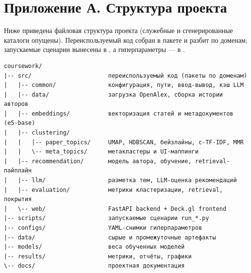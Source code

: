 \appendix
\section*{Приложение А. Структура проекта}

Ниже приведена файловая структура проекта (служебные и сгенерированные каталоги опущены).
Переиспользуемый код собран в пакете  и разбит по доменам; запускаемые сценарии вынесены
в , а гиперпараметры — в .

{\footnotesize
\begin{verbatim}
coursework/
|-- src/                      переиспользуемый код (пакеты по доменам)
|   |-- common/               конфигурация, пути, ввод-вывод, кэш LLM
|   |-- data/                 загрузка OpenAlex, сборка истории авторов
|   |-- embeddings/           векторизация статей и метадокументов (e5-base)
|   |-- clustering/
|   |   |-- paper_topics/     UMAP, HDBSCAN, бейзлайны, c-TF-IDF, MMR
|   |   \-- meta_topics/      метакластеры и UI-маппинги
|   |-- recommendation/       модель автора, обучение, retrieval-пайплайн
|   |-- llm/                  разметка тем, LLM-оценка рекомендаций
|   |-- evaluation/           метрики кластеризации, retrieval, покрытия
|   \-- web/                  FastAPI backend + Deck.gl frontend
|-- scripts/                  запускаемые сценарии run_*.py
|-- configs/                  YAML-снимки гиперпараметров
|-- data/                     сырые и промежуточные артефакты
|-- models/                   веса обученных моделей
|-- results/                  метрики, отчёты, графики
\-- docs/                     проектная документация
\end{verbatim}
}
